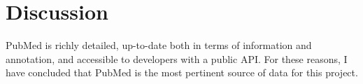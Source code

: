 \documentclass[PROP_AGutteridge_CS.tex]{subfiles}
\begin{document}
\section{Discussion}
PubMed is richly detailed, up-to-date both in terms of information and annotation, and accessible to developers with a public API. For these reasons, I have concluded that PubMed is the most pertinent source of data for this project.
\end{document}
